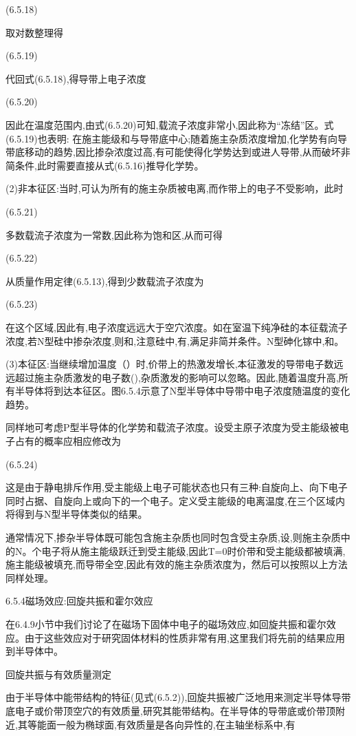  	(6.5.18)

取对数整理得

 	(6.5.19)

代回式(6.5.18),得导带上电子浓度

 	(6.5.20)

因此在温度范围内,由式(6.5.20)可知,载流子浓度非常小,因此称为“冻结”区。式(6.5.19)也表明: 在施主能级和与导带底中心;随着施主杂质浓度增加,化学势有向导带底移动的趋势,因比掺杂浓度过高,有可能使得化学势达到或进人导带,从而破坏非简条件,此时需要直接从式(6.5.16)推导化学势。

(2)非本征区:当时,可认为所有的施主杂质被电离,而作带上的电子不受影响，此时

	 (6.5.21)

多数载流子浓度为一常数,因此称为饱和区,从而可得

	(6.5.22)

从质量作用定律(6.5.13),得到少数载流子浓度为

	(6.5.23)

在这个区域,因此有,电子浓度远远大于空穴浓度。如在室温下纯净硅的本征载流子浓度,若N型硅中掺杂浓度,则和,注意硅中,有,满足非简并条件。N型砷化镓中,和。

(3)本征区:当继续增加温度（）时,价带上的热激发增长,本征激发的导带电子数远远超过施主杂质激发的电子数(),杂质激发的影响可以忽略。因此,随着温度升高,所有半导体将到达本征区。图6.5.4示意了N型半导体中导带中电子浓度随温度的变化趋势。



同样地可考虑P型半导体的化学势和载流子浓度。设受主原子浓度为受主能级被电子占有的概率应相应修改为

 	(6.5.24)

这是由于静电排斥作用,受主能级上电子可能状态也只有三种:自旋向上、向下电子同时占据、自旋向上或向下的一个电子。定义受主能级的电离温度,在三个区域内将得到与N型半导体类似的结果。

通常情况下,掺杂半导体既可能包含施主杂质也同时包含受主杂质,设,则施主杂质中的N。个电子将从施主能级跃迁到受主能级,因此T=0时价带和受主能级都被填满, 施主能级被填充,而导带全空,因此有效的施主杂质浓度为，然后可以按照以上方法同样处理。

6.5.4磁场效应:回旋共振和霍尔效应

在6.4.9小节中我们讨论了在磁场下固体中电子的磁场效应,如回旋共振和霍尔效应。由于这些效应对于研究固体材料的性质非常有用,这里我们将先前的结果应用到半导体中。

回旋共振与有效质量测定

由于半导体中能带结构的特征(见式(6.5.2)),回旋共振被广泛地用来测定半导体导带底电子或价带顶空穴的有效质量,研究其能带结构。在半导体的导带底或价带顶附近,其等能面一般为椭球面,有效质量是各向异性的,在主轴坐标系中,有

